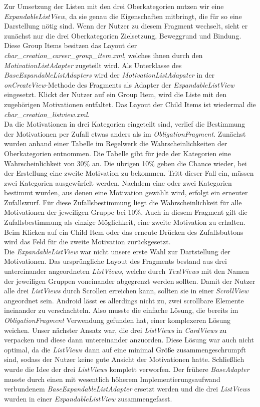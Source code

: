 Zur Umsetzung der Listen mit den drei Oberkategorien nutzen wir eine \textit{ExpandableListView}, da sie genau die Eigenschaften mitbringt, die für so eine Darstellung nötig sind. Wenn der Nutzer zu diesem Fragment wechselt, sieht er zunächst nur die drei Oberkategorien Zielsetzung, Beweggrund und Bindung. Diese Group Items besitzen das Layout der \textit{char\_creation\_career\_group\_item.xml}, welches ihnen durch den \textit{MotivationListAdapter} zugeteilt wird. Als Unterklasse des \textit{BaseExpandableListAdapters} wird der \textit{MotivationListAdapater} in der \textit{onCreateView}-Methode des Fragments als Adapter der \textit{ExpandableListView} eingesetzt. Klickt der Nutzer auf ein Group Item, wird die Liste mit den zugehörigen Motivationen entfaltet. Das Layout der Child Items ist wiedermal die \textit{char\_creation\_listview.xml}.\\

Da die Motivationen in drei Kategorien eingeteilt sind, verlief die Bestimmung der Motivationen per Zufall etwas anders als im \textit{ObligationFragment}. Zunächst wurden anhand einer Tabelle im Regelwerk \cite[94]{rulebook} die Wahrscheinlichkeiten der Oberkategorien entnommen. Die Tabelle gibt für jede der Kategorien eine Wahrscheinlichkeit von 30\% an. Die übrigen 10\% geben die Chance wieder, bei der Erstellung eine zweite Motivation zu bekommen. Tritt dieser Fall ein, müssen zwei Kategorien ausgewürfelt werden. Nachdem eine oder zwei Kategorien bestimmt wurden, aus denen eine Motivation gewählt wird, erfolgt ein erneuter Zufallswurf. Für diese Zufallsbestimmung liegt die Wahrscheinlichkeit für alle Motivationen der jeweiligen Gruppe bei 10\%. Auch in diesem Fragment gilt die Zufallsbestimmung als einzige Möglichkeit, eine zweite Motivation zu erhalten. Beim Klicken auf ein Child Item oder das erneute Drücken des Zufallsbuttons wird das Feld für die zweite Motivation zurückgesetzt.\\

Die \textit{ExpandableListView} war nicht unsere erste Wahl zur Dartstellung der Motivationen. Das ursprüngliche Layout des Fragments bestand aus drei untereinander angeordneten \textit{ListViews}, welche
durch \textit{TextViews} mit den Namen der jeweiligen Gruppen voneinander abgegrenzt werden sollten. Damit der Nutzer alle drei \textit{ListViews} durch Scrollen erreichen kann, sollten sie in einer \textit{ScrollView} angeordnet sein. Android lässt es allerdings nicht zu, zwei scrollbare Elemente ineinander zu verschachteln. Also musste die einfache Lösung, die bereits im \textit{ObligationFragment} Verwendung gefunden hat, einer komplexeren Lösung weichen. Unser nächster Ansatz war, die drei \textit{ListViews} in \textit{CardViews} zu verpacken und diese dann untereinander anzuorden. Diese Lösung war auch nicht optimal, da die \textit{ListViews} dann auf eine minimal Größe zusammengeschrumpft sind, sodass der Nutzer keine gute Ansicht der Motivationen hatte. Schließlich wurde die Idee der drei \textit{ListViews} komplett verworfen. Der frühere \textit{BaseAdapter} musste durch einen mit wesentlich höherem Implementierungsaufwand verbundenem \textit{BaseExpandableListAdapter} ersetzt werden und die drei \textit{ListViews} wurden in einer \textit{ExpandableListView} zusammengefasst.

